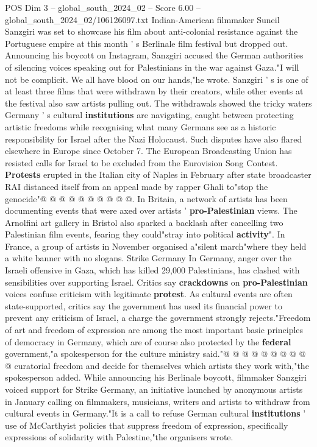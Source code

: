 \begin{textsample}{POS Dim 3 – global\_south\_2024\_02 – Score 6.00 – global\_south\_2024\_02/106126097.txt}  \label{ex:f3_pos_377}
Indian-American filmmaker Suneil Sanzgiri was set to showcase his film about anti-colonial resistance against the Portuguese empire at this month ' s Berlinale film festival but dropped out.
Announcing his boycott on Instagram, Sanzgiri accused the German authorities of silencing voices speaking out for Palestinians in the war against Gaza."I will not be complicit.
We all have blood on our hands,"he wrote.
Sanzgiri ' s is one of at least three films that were withdrawn by their creators, while other events at the festival also saw artists pulling out.
The withdrawals showed the tricky waters Germany ' s cultural \textbf{institutions} are navigating, caught between protecting artistic freedoms while recognising what many Germans see as a historic responsibility for Israel after the Nazi Holocaust.
Such disputes have also flared elsewhere in Europe since October 7.
The European Broadcasting Union has resisted calls for Israel to be excluded from the Eurovision Song Contest. \textbf{Protests} erupted in the Italian city of Naples in February after state broadcaster RAI distanced itself from an appeal made by rapper Ghali to"stop the genocide"@ @ @ @ @ @ @ @ @ @.
In Britain, a network of artists has been documenting events that were axed over artists ' \textbf{pro-Palestinian} views.
The Arnolfini art gallery in Bristol also sparked a backlash after cancelling two Palestinian film events, fearing they could"stray into political \textbf{activity}".
In France, a group of artists in November organised a"silent march"where they held a white banner with no slogans.
Strike Germany In Germany, anger over the Israeli offensive in Gaza, which has killed 29,000 Palestinians, has clashed with sensibilities over supporting Israel.
Critics say \textbf{crackdowns} on \textbf{pro-Palestinian} voices confuse criticism with legitimate \textbf{protest}.
As cultural events are often state-supported, critics say the government has used its financial power to prevent any criticism of Israel, a charge the government strongly rejects."Freedom of art and freedom of expression are among the most important basic principles of democracy in Germany, which are of course also protected by the \textbf{federal} government,"a spokesperson for the culture ministry said."@ @ @ @ @ @ @ @ @ @ curatorial freedom and decide for themselves which artists they work with,"the spokesperson added.
While announcing his Berlinale boycott, filmmaker Sanzgiri voiced support for Strike Germany, an initiative launched by anonymous artists in January calling on filmmakers, musicians, writers and artists to withdraw from cultural events in Germany."It is a call to refuse German cultural \textbf{institutions} ' use of McCarthyist policies that suppress freedom of expression, specifically expressions of solidarity with Palestine,"the organisers wrote.

\end{textsample}
